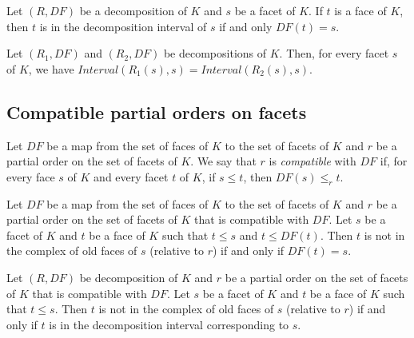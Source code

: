 \begin{subdefi}[DecompositionInterval\_eq]
Let $(R,DF)$ be a decomposition of $K$ and $s$ be a facet of $K$. If $t$ is a face of $K$, then $t$ is in the decomposition
interval of $s$ if and only $DF(t)=s$.

\end{subdefi}

\begin{sublemma}
Let $(R_1,DF)$ and $(R_2,DF)$ be decompositions of $K$. Then, for every facet $s$ of $K$, we have
$Interval(R_1(s),s)=Interval(R_2(s),s)$.

\end{sublemma}


\subsection{Compatible partial orders on facets}

\begin{subdefi}[CompatibleOrder]
Let $DF$ be a map from the set of faces of $K$ to the set of facets of $K$ and $r$ be a partial order on the set of
facets of $K$. We say that $r$ is \emph{compatible} with $DF$ if, for every face $s$ of $K$ and every facet $t$ of $K$,
if $s\le t$, then $DF(s)\le_r t$.

\end{subdefi}

\begin{sublemma}[OldFacesCompatibleOrder]
Let $DF$ be a map from the set of faces of $K$ to the set of facets of $K$ and $r$ be a partial order on the set of
facets of $K$ that is compatible with $DF$. Let $s$ be a facet of $K$ and $t$ be a face of $K$ such that $t\le s$ and
$t\le DF(t)$. Then $t$ is not in the complex of old faces of $s$ (relative to $r$) if and only if $DF(t)=s$.

\end{sublemma}

\begin{sublemma}[OldFacesDecomposition]
Let $(R,DF)$ be decomposition of $K$ and $r$ be a partial order on the set of
facets of $K$ that is compatible with $DF$. Let $s$ be a facet of $K$ and $t$ be a face of $K$ such that $t\le s$.
Then $t$ is not in the complex of old faces of $s$ (relative to $r$) if and only if $t$ is in the decomposition interval
corresponding to $s$.

\end{sublemma}

